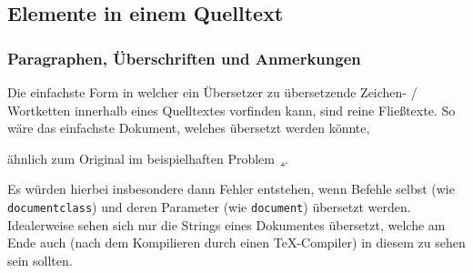 


\newpage




\subsection{Elemente in einem Quelltext}





\subsubsection{Paragraphen, Überschriften und Anmerkungen}\label{subsubsec:problems:texts}%
Die einfachste Form in welcher ein Übersetzer zu übersetzende Zeichen- / Wortketten innerhalb eines Quelltextes vorfinden kann, sind reine Fließtexte. So wäre das einfachste Dokument, welches übersetzt werden könnte, 
\addtocounter{displaySourceCode}{1}
ähnlich zum Original im beispielhaften Problem~\hyperref[exem:problems:paragraph]{\thesection.\thedisplaySourceCode}. 
\addtocounter{displaySourceCode}{-1}

Es würden hierbei insbesondere dann Fehler entstehen, wenn Befehle selbst (wie \texttt{documentclass}) und deren Parameter (wie \texttt{document}) übersetzt werden. Idealerweise sehen sich nur die Strings eines Dokumentes übersetzt, welche am Ende auch (nach dem Kompilieren durch einen \TeX{}-Compiler) in diesem zu sehen sein sollten.

